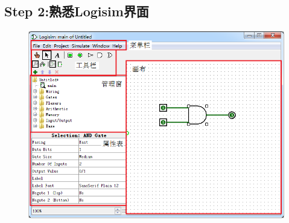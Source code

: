 \documentclass{article}
\begin{document}
		\subsection*{Step 2:熟悉Logisim界面}
			\begin{figure}[H]
					\centering
					\includegraphics[scale=0.8]{b-2.png}
				\end{figure}
\end{document}
